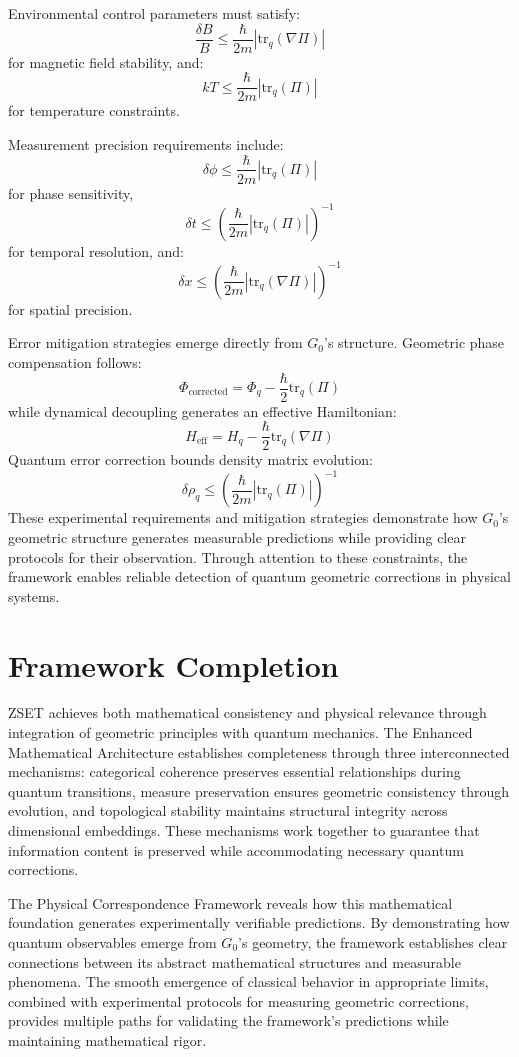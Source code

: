 \documentclass[10pt]{article}
\begin{document}
Environmental control parameters must satisfy:
\[
\frac{\delta B}{B} \leq \frac{\hbar}{2m}|\text{tr}_q(\nabla\Pi)|
\]
for magnetic field stability, and:
\[
kT \leq \frac{\hbar}{2m}|\text{tr}_q(\Pi)|
\]
for temperature constraints.

Measurement precision requirements include:
\[
\delta \phi \leq \frac{\hbar}{2m}|\text{tr}_q(\Pi)|
\]
for phase sensitivity,
\[
\delta t \leq \left(\frac{\hbar}{2m}|\text{tr}_q(\Pi)|\right)^{-1}
\]
for temporal resolution, and:
\[
\delta x \leq \left(\frac{\hbar}{2m}|\text{tr}_q(\nabla \Pi)|\right)^{-1}
\]
for spatial precision.

Error mitigation strategies emerge directly from $G_0$'s structure. Geometric phase compensation follows:
\[
\Phi_{\text{corrected}} = \Phi_q - \frac{\hbar}{2}\text{tr}_q(\Pi)
\]
while dynamical decoupling generates an effective Hamiltonian:
\[
H_{\text{eff}} = H_q - \frac{\hbar}{2}\text{tr}_q(\nabla \Pi)
\]
Quantum error correction bounds density matrix evolution:
\[
\delta \rho_q \leq \left(\frac{\hbar}{2m}|\text{tr}_q(\Pi)|\right)^{-1}
\]
These experimental requirements and mitigation strategies demonstrate how $G_0$'s geometric structure generates measurable predictions while providing clear protocols for their observation. Through attention to these constraints, the framework enables reliable detection of quantum geometric corrections in physical systems.

\section{Framework Completion}

ZSET achieves both mathematical consistency and physical relevance through integration of geometric principles with quantum mechanics. The Enhanced Mathematical Architecture establishes completeness through three interconnected mechanisms: categorical coherence preserves essential relationships during quantum transitions, measure preservation ensures geometric consistency through evolution, and topological stability maintains structural integrity across dimensional embeddings. These mechanisms work together to guarantee that information content is preserved while accommodating necessary quantum corrections.

The Physical Correspondence Framework reveals how this mathematical foundation generates experimentally verifiable predictions. By demonstrating how quantum observables emerge from \(G_0\)'s geometry, the framework establishes clear connections between its abstract mathematical structures and measurable phenomena. The smooth emergence of classical behavior in appropriate limits, combined with experimental protocols for measuring geometric corrections, provides multiple paths for validating the framework's predictions while maintaining mathematical rigor.
\end{document}
